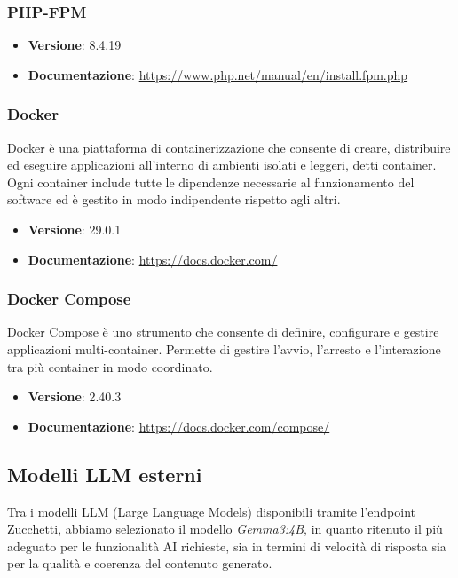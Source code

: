 \documentclass[a4paper,10pt]{article}
\begin{document}
\subsubsection{PHP-FPM}

\begin{itemize}
    \item \textbf{Versione}: 8.4.19
    \item \textbf{Documentazione}: \url{https://www.php.net/manual/en/install.fpm.php}
\end{itemize}

\subsubsection{Docker}
Docker è una piattaforma di containerizzazione che consente di creare, distribuire ed eseguire applicazioni all’interno di ambienti isolati e leggeri, detti container. Ogni container include tutte le dipendenze necessarie al funzionamento del software ed è gestito in modo indipendente rispetto agli altri.
\begin{itemize}
    \item \textbf{Versione}: 29.0.1
    \item \textbf{Documentazione}: \url{https://docs.docker.com/}
\end{itemize}

\subsubsection{Docker Compose}
Docker Compose è uno strumento che consente di definire, configurare e gestire applicazioni multi-container. Permette di gestire l’avvio, l’arresto e l’interazione tra più container in modo coordinato.
\begin{itemize}
    \item \textbf{Versione}: 2.40.3
    \item \textbf{Documentazione}: \url{https://docs.docker.com/compose/}
\end{itemize}

\subsection{Modelli LLM esterni}
Tra i modelli LLM (Large Language Models) disponibili tramite l'endpoint Zucchetti, abbiamo selezionato il modello \textit{Gemma3:4B}, in quanto ritenuto il più adeguato per le funzionalità AI richieste, sia in termini di velocità di risposta sia per la qualità e coerenza del contenuto generato.
\end{document}
